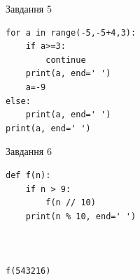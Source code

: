 \documentclass[12pt, ukrainian]{article}
\begin{document}
{\vspace{15mm}
\begin{minipage}[t]{9.7cm}                
{\begin{center}Завдання {5}\end{center}}
\begin{verbatim}
for a in range(-5,-5+4,3):
    if a>=3:
        continue
    print(a, end=' ')
    a=-9
else:
    print(a, end=' ')
print(a, end=' ')
\end{verbatim}     
\end{minipage}
\vline \hspace{8mm}
\begin{minipage}[t]{8.0cm}                
{\begin{center}Завдання {6}\end{center}}
\begin{verbatim}
def f(n):
    if n > 9:
        f(n // 10)
    print(n % 10, end=' ')
    


f(543216)
\end{verbatim}     
\end{minipage}

}
\newpage
\end{document}
